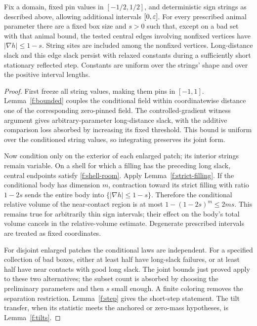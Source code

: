\begin{corollary}\label{f:conditioned-sparse}
Fix a domain, fixed pin values in $[-1/2,1/2]$, and deterministic sign
strings as described above, allowing additional intervals $[0,\varepsilon]$.
For every prescribed animal parameter there are a fixed box size and
$s>0$ such that, except on a bad set with that animal bound, the tested
central edges involving nonfixed vertices have $|\nabla h|\le1-s$.
String sites are included among the nonfixed vertices. Long-distance
slack and this edge slack persist with relaxed constants during a
sufficiently short stationary reflected step. Constants are uniform
over the strings' shape and over the positive interval lengths.
\end{corollary}
\begin{proof}
First freeze all string values, making them pins in $[-1,1]$.
Lemma~\ref{f:bounded} couples the conditional field within coordinatewise
distance one of the corresponding zero-pinned field. The controlled-gradient
witness argument gives arbitrary-parameter long-distance slack, with
the additive comparison loss absorbed by increasing its fixed threshold.
This bound is uniform over the conditioned string values, so integrating
preserves its joint form.

Now condition only on the exterior of each enlarged patch; its interior
strings remain variable. On a shell for which a filling has the preceding
long slack, central endpoints satisfy \eqref{f:shell-room}. Apply
Lemma~\ref{f:strict-filling}. If the conditional body has dimension $m$,
contraction toward its strict filling with ratio $1-2s$ sends the entire
body into $\{|\nabla h|\le1-s\}$. Therefore the conditional relative volume
of the near-contact region is at most
$1-(1-2s)^m\le2ms$. This remains true for arbitrarily thin sign intervals;
their effect on the body's total volume cancels in the relative-volume
estimate. Degenerate prescribed intervals are treated as fixed coordinates.

For disjoint enlarged patches the conditional laws are independent.
For a specified collection of bad boxes, either at least half have
long-slack failures, or at least half have near contacts with good long
slack. The joint bounds just proved apply to these two alternatives;
the subset count is absorbed by choosing the preliminary parameters
and then $s$ small enough. A finite coloring removes the separation
restriction. Lemma~\ref{f:step} gives the short-step statement. The tilt
transfer, when its statistic meets the anchored or zero-mass hypotheses,
is Lemma~\ref{f:tilts}.
\end{proof}

